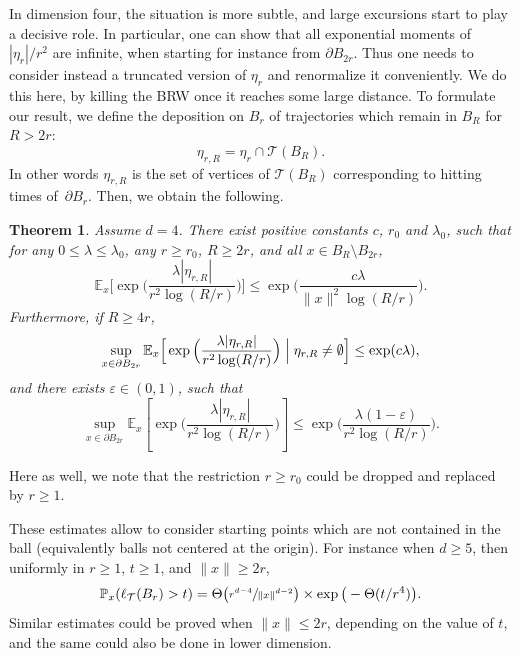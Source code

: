 \documentclass[11pt]{article}
\numberwithin{equation}{section}
\theoremstyle{plain}
\newtheorem{theorem}{Theorem}[section]
\theoremstyle{definition}
\newcommand\T{\mathcal{T}}
\newcommand{\1}{{\text{\Large $\mathfrak 1$}}}
\begin{document}
In dimension four, the situation is more subtle, and large excursions start to play a decisive role.
In particular, one can show that
all exponential moments of $|\eta_r|/r^2$ are infinite, when starting for instance from $\partial B_{2r}$.
Thus one needs to consider instead a truncated version of $\eta_r$ and renormalize it conveniently.
We do this here, by killing the BRW once it reaches some
large distance. To formulate our result, we define the deposition on $B_r$ of
trajectories which remain in $B_R$ for $R>2r$:
\begin{equation*}%
\eta_{r,R} = \eta_r\cap \T(B_R).
\end{equation*}
In other words $\eta_{r,R}$ is the set of vertices
of $\mathcal T(B_R)$ corresponding to hitting times of~$\partial B_r$. Then, we obtain the following.
\begin{theorem}\label{theo.outside4}
Assume $d = 4$. There exist positive constants $c$, $r_0$ and $\lambda_0$, such that for any $0\le \lambda\le \lambda_0$, any $r\ge r_0$, $R\ge 2r$,
and all $x\in B_R\setminus B_{2r}$,
\begin{equation}\label{outside4.1}
\mathbb E_x\Big[\exp \Big(\frac{\lambda|\eta_{r,R}|}{r^2\log (R/r)} \Big)\Big] \le \exp\Big(\frac{c\lambda}{\|x\|^2\log (R/r)}\Big).
\end{equation}
Furthermore, if $R\ge 4r$,
\begin{equation}\label{outside4.2}
\sup_{x\in \partial B_{2r}} \mathbb E_x\Big[
\exp \Big(\frac{\lambda|\eta_{r,R}|}{r^2\log (R/r)} \Big)\Bigm| \eta_{r,R}\neq \emptyset \Big] \le \exp(c\lambda),
\end{equation}
and there exists $\varepsilon \in (0,1)$, such that
\begin{equation}\label{outside4.3}
\sup_{x\in \partial B_{2r}} \mathbb E_x\left[\exp\Big(
\frac{\lambda |\eta_{r,R}|}{r^2\log(R/r)}\Big)\right] \le \exp\Big(\frac{\lambda(1-\varepsilon)}{r^2\log(R/r)}\Big).
\end{equation}
\end{theorem}
Here as well, we note that the restriction $r\ge r_0$ could be dropped and replaced by $r\ge 1$.

These estimates allow to consider starting points which
are not contained in the ball (equivalently balls not centered at the origin).
For instance when $d\ge 5$, then uniformly in $r\ge 1$, $t\ge 1$, and $\|x\|\ge 2r$,
\begin{equation*}
\mathbb P_x(\ell_{\T}(B_r) > t) =
\Theta\big(\sfrac{r^{d-4}}{\|x\|^{d-2}}\big) \times\exp \big(-\Theta(t/r^4)\big).
\end{equation*}
Similar estimates could be proved when $\|x\|\le 2r$,
depending on the value of $t$, and the same could also be done in lower dimension.
\end{document}
